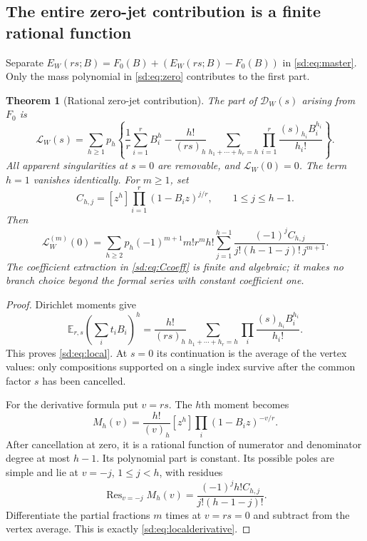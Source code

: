 \documentclass[11pt,a4paper]{article}
\numberwithin{equation}{section}
\newtheorem{theorem}{Theorem}[section]
\theoremstyle{definition}
\theoremstyle{remark}
\begin{document}
\subsection{The entire zero-jet contribution is a finite rational function}
\label{sd:subsec:local}

Separate $E_W(rs;B)=F_0(B)+(E_W(rs;B)-F_0(B))$ in
\eqref{sd:eq:master}.  Only the mass polynomial in
\eqref{sd:eq:zero} contributes to the first part.

\begin{theorem}[Rational zero-jet contribution]
\label{sd:thm:local}
The part of $\mathcal D_W(s)$ arising from $F_0$ is
\begin{equation}\label{sd:eq:local}
 \boxed{\displaystyle
 \mathcal L_W(s)=\sum_{h\ge1}p_h\left\{
 \frac1r\sum_{i=1}^r B_i^h-
 \frac{h!}{(rs)_h}
       \sum_{h_1+\cdots+h_r=h}
            \prod_{i=1}^r\frac{(s)_{h_i}B_i^{h_i}}{h_i!}
                                      \right\}.}
\end{equation}
All apparent singularities at $s=0$ are removable, and
$\mathcal L_W(0)=0$.  The term $h=1$ vanishes identically.  For
$m\ge1$, set
\begin{equation}\label{sd:eq:Ccoeff}
 C_{h,j}=[z^h]\prod_{i=1}^r(1-B_i z)^{j/r},
             \qquad 1\le j\le h-1.
\end{equation}
Then
\begin{equation}\label{sd:eq:localderivative}
 \boxed{\displaystyle
 \mathcal L_W^{(m)}(0)=
 \sum_{h\ge2}p_h(-1)^{m+1}m!r^m h!
  \sum_{j=1}^{h-1}
    \frac{(-1)^jC_{h,j}}{j!(h-1-j)!\,j^{m+1}}.}
\end{equation}
The coefficient extraction in \eqref{sd:eq:Ccoeff} is finite and
algebraic; it makes no branch choice beyond the formal series with
constant coefficient one.
\end{theorem}
\begin{proof}
Dirichlet moments give
\[
 \mathbb E_{r,s}\left(\sum_i t_iB_i\right)^h
  =\frac{h!}{(rs)_h}
       \sum_{h_1+\cdots+h_r=h}
                    \prod_i\frac{(s)_{h_i}B_i^{h_i}}{h_i!}.
\]
This proves \eqref{sd:eq:local}.  At $s=0$ its continuation is the
average of the vertex values: only compositions supported on a single
index survive after the common factor $s$ has been cancelled.

For the derivative formula put $v=rs$.  The $h$th moment becomes
\[
 M_h(v)=\frac{h!}{(v)_h}
                   [z^h]\prod_i(1-B_i z)^{-v/r}.
\]
After cancellation at zero, it is a rational function of numerator and
denominator degree at most $h-1$.  Its polynomial part is constant.
Its possible poles are simple and lie at $v=-j$, $1\le j<h$, with
residues
\[
 \operatorname{Res}_{v=-j}M_h(v)
   =\frac{(-1)^j h!C_{h,j}}{j!(h-1-j)!}.
\]
Differentiate the partial fractions $m$ times at $v=rs=0$ and subtract
from the vertex average.  This is exactly
\eqref{sd:eq:localderivative}.
\end{proof}
\end{document}
